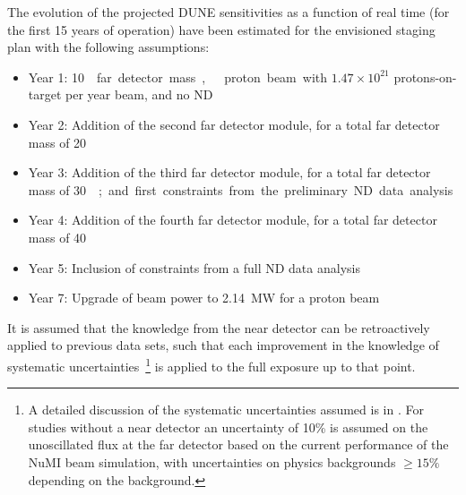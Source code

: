 
The evolution of the projected DUNE sensitivities as a function of real time
(for the first \num{15} years of operation) have been estimated for the envisioned staging plan
with the following assumptions:
\begin{itemize}
\item Year 1: \SI{10}\kt{} far detector mass,  
  proton beam with $1.47 \times 10^{21}$ protons-on-target per year
  beam, and no ND
\item Year 2: Addition of the second  far detector module, for a total far detector mass of
  \SI{20}\kt
\item Year 3: Addition of the third  far detector module, for a total far detector mass of
  \SI{30}\kt; and first constraints from the preliminary ND data analysis
\item Year 4: Addition of the fourth  far detector module, for a total far detector mass of
  \SI{40}\kt
\item Year 5: Inclusion of constraints from a full ND data analysis
 \item Year 7: Upgrade of beam power to \SI{2.14}{\MW} for a 
  proton beam
\end{itemize}

It is assumed that the knowledge from the near detector can be
retroactively applied to previous data sets, such that each
improvement in the knowledge of systematic uncertainties~\footnote{A
  detailed discussion of the systematic uncertainties assumed is in
  \volphys. For studies without a near detector an uncertainty of 10\%
  is assumed on the unoscillated flux at the far detector based on the
  current performance of the NuMI beam simulation, with uncertainties
  on physics backgrounds $\geq 15\%$ depending on the background.} is
applied to the full exposure up to that point.



%


